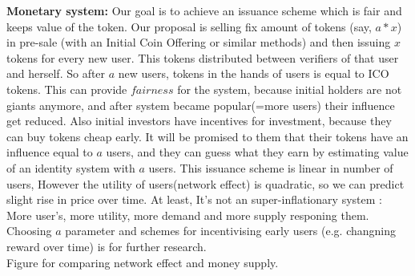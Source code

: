 \documentclass{article}
\begin{document}
\textbf{Monetary system:} Our goal is to achieve an issuance scheme which is fair and keeps value of the token. Our proposal is selling fix amount of tokens (say, $a*x$) in pre-sale (with an Initial Coin Offering  or similar methods) and then issuing $x$ tokens for every new user. This tokens distributed between verifiers of that user and herself. So after $a$ new users, tokens in the hands of users is equal to ICO tokens. This can provide $fairness$ for the system, because initial holders are not giants anymore, and after system became popular(=more users) their influence get reduced. Also initial investors have incentives for investment, because they can buy tokens cheap early. It will be promised to them that their tokens have an influence equal to $a$ users, and they can guess what they earn by estimating value of an identity system with $a$ users. This issuance scheme is linear in number of users, However the utility of users(network effect) is quadratic, so we can predict slight rise in price over time. At least, It's not an super-inflationary system : More user's, more utility, more demand and more supply responing them. Choosing $a$ parameter and schemes for incentivising early users (e.g. changning reward over time) is for further research.\\ 



Figure for comparing network effect and money supply.
\end{document}
